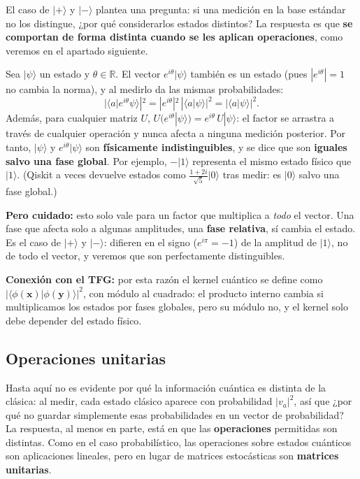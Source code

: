 \documentclass[11pt, a4paper, twoside, openright]{report}
\begin{document}
\noindent El caso de $|+\rangle$ y $|-\rangle$ plantea una pregunta: si una medición en la base estándar no los distingue, ¿por qué considerarlos estados distintos? La respuesta es que \textbf{se comportan de forma distinta cuando se les aplican operaciones}, como veremos en el apartado siguiente.

\begin{tcolorbox}[colback=blue!5!white,colframe=blue!75!black,title=\textbf{Nota Aclaratoria: Fase global y fase relativa}]
Sea $|\psi\rangle$ un estado y $\theta \in \mathbb{R}$. El vector $e^{i\theta}|\psi\rangle$ también es un estado (pues $|e^{i\theta}| = 1$ no cambia la norma), y al medirlo da las mismas probabilidades:
\[ |\langle a|e^{i\theta}\psi\rangle|^2 = |e^{i\theta}|^2\,|\langle a|\psi\rangle|^2 = |\langle a|\psi\rangle|^2. \]
Además, para cualquier matriz $U$, $U(e^{i\theta}|\psi\rangle) = e^{i\theta}\,U|\psi\rangle$: el factor se arrastra a través de cualquier operación y nunca afecta a ninguna medición posterior. Por tanto, $|\psi\rangle$ y $e^{i\theta}|\psi\rangle$ son \textbf{físicamente indistinguibles}, y se dice que son \textbf{iguales salvo una fase global}. Por ejemplo, $-|1\rangle$ representa el mismo estado físico que $|1\rangle$. (Qiskit a veces devuelve estados como $\frac{1+2i}{\sqrt 5}|0\rangle$ tras medir: es $|0\rangle$ salvo una fase global.)

\textbf{Pero cuidado:} esto solo vale para un factor que multiplica a \textit{todo} el vector. Una fase que afecta solo a algunas amplitudes, una \textbf{fase relativa}, sí cambia el estado. Es el caso de $|+\rangle$ y $|-\rangle$: difieren en el signo ($e^{i\pi} = -1$) de la amplitud de $|1\rangle$, no de todo el vector, y veremos que son perfectamente distinguibles.

\textbf{Conexión con el TFG:} por esta razón el kernel cuántico se define como $|\langle\phi(\mathbf{x})|\phi(\mathbf{y})\rangle|^2$, con módulo al cuadrado: el producto interno cambia si multiplicamos los estados por fases globales, pero su módulo no, y el kernel solo debe depender del estado físico.
\end{tcolorbox}

\subsection{Operaciones unitarias}

\noindent Hasta aquí no es evidente por qué la información cuántica es distinta de la clásica: al medir, cada estado clásico aparece con probabilidad $|v_a|^2$, así que ¿por qué no guardar simplemente esas probabilidades en un vector de probabilidad? La respuesta, al menos en parte, está en que las \textbf{operaciones} permitidas son distintas. Como en el caso probabilístico, las operaciones sobre estados cuánticos son aplicaciones lineales, pero en lugar de matrices estocásticas son \textbf{matrices unitarias}.
\end{document}
